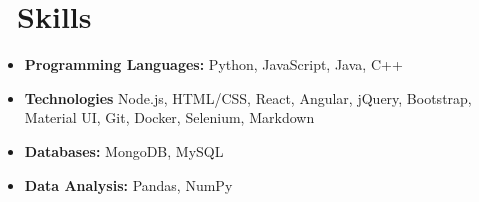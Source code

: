 \documentclass{resume}
\begin{document}
\section[Skills]{\faCogs\ Skills}
\begin{itemize}
\item \textbf{Programming Languages:} Python, JavaScript, Java, C++
\item \textbf{Technologies} Node.js, HTML/CSS, React, Angular, jQuery, Bootstrap, Material UI, Git, Docker, Selenium, Markdown
\item \textbf{Databases:} MongoDB, MySQL
\item \textbf{Data Analysis:} Pandas, NumPy
\end{itemize}
\end{document}
